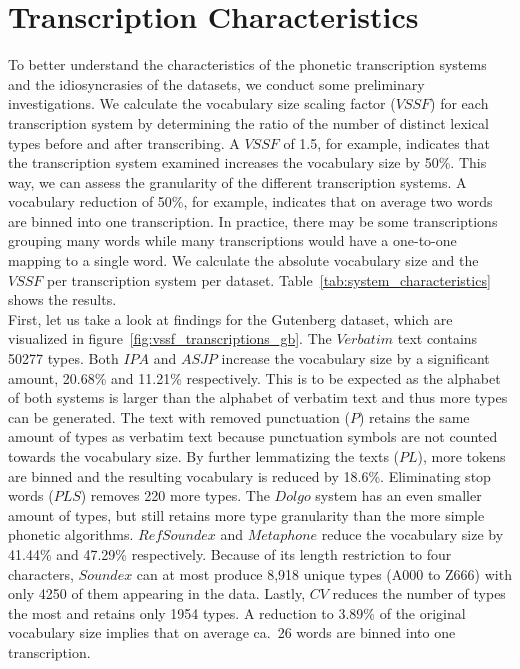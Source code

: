 \section{Transcription Characteristics}
To better understand the characteristics of the phonetic transcription systems and the idiosyncrasies of the datasets, we conduct some preliminary investigations.
We calculate the vocabulary size scaling factor ($VSSF$) for each transcription system by determining the ratio of the number of distinct lexical types before and after transcribing.
A $VSSF$ of 1.5, for example, indicates that the transcription system examined increases the vocabulary size by 50\%.
This way, we can assess the granularity of the different transcription systems.
A vocabulary reduction of 50\%, for example, indicates that on average two words are binned into one transcription.
In practice, there may be some transcriptions grouping many words while many transcriptions would have a one-to-one mapping to a single word.
We calculate the absolute vocabulary size and the $VSSF$ per transcription system per dataset.
Table~\ref{tab:system_characteristics} shows the results.\\
First, let us take a look at findings for the Gutenberg dataset, which are visualized in figure~\ref{fig:vssf_transcriptions_gb}.
The $Verbatim$ text contains 50277 types.
Both $IPA$ and $ASJP$ increase the vocabulary size by a significant amount, 20.68\% and 11.21\% respectively.
This is to be expected as the alphabet of both systems is larger than the alphabet of verbatim text and thus more types can be generated.
The text with removed punctuation ($P$) retains the same amount of types as verbatim text because punctuation symbols are not counted towards the vocabulary size.
By further lemmatizing the texts ($PL$), more tokens are binned and the resulting vocabulary is reduced by 18.6\%.
Eliminating stop words ($PLS$) removes 220 more types.
The $Dolgo$ system has an even smaller amount of types, but still retains more type granularity than the more simple phonetic algorithms.
$RefSoundex$ and $Metaphone$ reduce the vocabulary size by 41.44\% and 47.29\% respectively.
Because of its length restriction to four characters, $Soundex$ can at most produce 8,918 unique types (A000 to Z666) with only 4250 of them appearing in the data.
Lastly, $CV$ reduces the number of types the most and retains only 1954 types.
A reduction to 3.89\% of the original vocabulary size implies that on average ca.\ 26 words are binned into one transcription.\\

